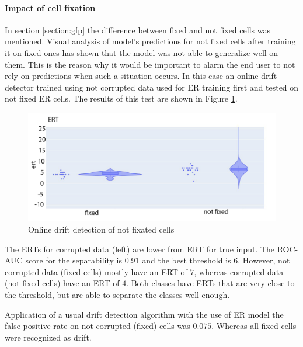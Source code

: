             \paragraph{Impact of cell fixation}
                In section \ref{section:gfp} the difference between fixed and not fixed cells was mentioned. Visual analysis of model's predictions for not fixed cells after training it on fixed ones has shown that the model was not able to generalize well on them. This is the reason why it would be important to alarm the end user to not rely on predictions when such a situation occurs. In this case an online drift detector trained using not corrupted data used for ER training first and tested on not fixed ER cells. The results of this test are shown in Figure \ref{fig:online-drift-not-fixed}.
                \begin{figure}[htb]
                    \begin{center}
                        \includegraphics[width=0.5\linewidth]{bilder/drift-detection/online-fixed-vs-not-fixed.png}
                        \caption{Online drift detection of not fixated cells}\label{fig:online-drift-not-fixed}
                    \end{center}
                \end{figure}
                The ERTs for corrupted data (left) are lower from ERT for true input. The ROC-AUC score for the separability is $0.91$ and the best threshold is $6$. However, not corrupted data (fixed cells) mostly have an ERT of $7$, whereas corrupted data (not fixed cells) have an ERT of $4$. Both classes have ERTs that are very close to the threshold, but are able to separate the classes well enough.

                Application of a usual drift detection algorithm with the use of ER model the false positive rate on not corrupted (fixed) cells was $0.075$. Whereas all fixed cells were recognized as drift.  